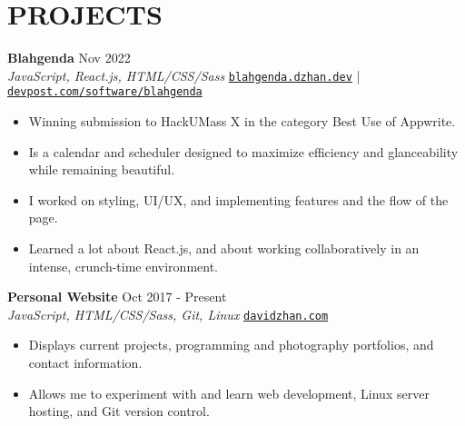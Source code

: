 \documentclass[letterpaper,10pt]{extarticle}
\begin{document}

\section*{PROJECTS}
\noindent
\textbf{Blahgenda} \hfill Nov 2022\\ %
\textit{JavaScript, React.js, HTML/CSS/Sass} \hfill \texttt{\href{https://blahgenda.dzhan.dev}{blahgenda.dzhan.dev}} | \texttt{\href{https://devpost.com/software/blahgenda}{devpost.com/software/blahgenda}}
\begin{itemize}
    \item Winning submission to HackUMass X in the category Best Use of Appwrite.
    \item Is a calendar and scheduler designed to maximize efficiency and glanceability while remaining beautiful.
    \item I worked on styling, UI/UX, and implementing features and the flow of the page.
    \item Learned a lot about React.js, and about working collaboratively in an intense, crunch-time environment.
\end{itemize}

\noindent
\textbf{Personal Website} \hfill Oct 2017 - Present\\ %
\textit{JavaScript, HTML/CSS/Sass, Git, Linux} \hfill \texttt{\href{https://davidzhan.com}{davidzhan.com}} %
\begin{itemize}
    \item Displays current projects, programming and photography portfolios, and contact information.
    \item Allows me to experiment with and learn web development, Linux server hosting, and Git version control. %
\end{itemize}
\end{document}
